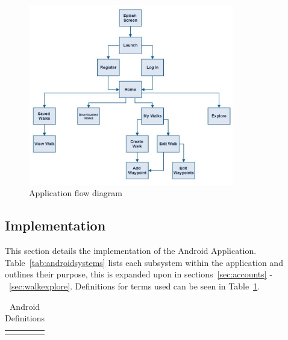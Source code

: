 \documentclass[11pt,a4paper]{report}
\begin{document}
\begin{figure}[H]
    \centering
    \includegraphics[width=0.8\textwidth]{chris/flow}
    \caption{Application flow diagram}
    \label{fig:flow}
\end{figure}

\subsection{Implementation}
This section details the implementation of the Android Application. Table~\ref{tab:androidsystems} lists each subsystem within the application and outlines their purpose, this is expanded upon in sections~\ref{sec:accounts} -~\ref{sec:walkexplore}. Definitions for terms used can be seen in Table~\ref{tab:androidDefs}.

\begin{longtable}{|p{2cm}|p{8cm}|}
\hline \caption{Android Definitions} \label{tab:androidDefs} \endlastfoot
\end{longtable}
\end{document}
